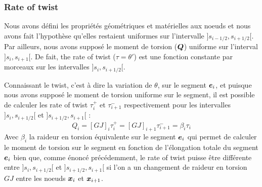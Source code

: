 \subsubsection{Rate of twist}
Nous avons défini les propriétés géométriques et matérielles aux noeuds et nous avons fait l'hypothèse qu'elles restaient uniformes sur l'intervalle $]s_{i-1/2},s_{i+1/2}[$. Par ailleurs, nous avons supposé le moment de torsion ($\boldsymbol{Q}$) uniforme sur l'interval  $]s_i,s_{i+1}[$. 
De fait, the rate of twist ($\tau = \theta'$) est une fonction constante par morceaux sur les intervalles $]s_i,s_{i+1/2}[$.

Connaissant le twist, c'est à dire la variation de $\theta$, sur le segment $\boldsymbol{e}_i$, et puisque nous avons supposé le moment de torsion uniforme sur le segment, il est possible de calculer les rate of twist $\tau_{i}^{+}$ et $\tau_{i+1}^{-}$ respectivement pour les intervalles $]s_i,s_{i+1/2}[$ et $]s_{i+1/2},s_{i+1}[$ :
\begin{equation}
	Q_i = [GJ]_{i} \tau_{i}^{+}
	= [GJ]_{i+1} \tau_{i+1}^{-}
	= \beta_i \tau_i
\end{equation}
Avec $\beta_i$ la raideur en torsion équivalente sur le segment $\boldsymbol{e}_i$ qui permet de calculer le moment de torsion sur le segment en fonction de l'élongation totale du segment $\boldsymbol{e}_i$ bien que, comme énoncé précédemment, le rate of twist puisse être différente entre $]s_i,s_{i+1/2}[$ et $]s_{i+1/2},s_{i+1}[$ si l'on a un changement de raideur en torsion $GJ$ entre les noeuds $\boldsymbol{x}_i$ et $\boldsymbol{x}_{i+1}$.

